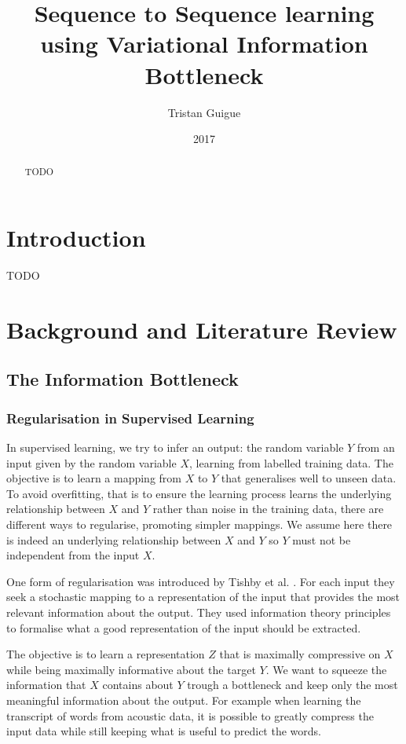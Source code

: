 \documentclass[10pt,oneside,openright]{report}
\title{Sequence to Sequence learning using Variational Information Bottleneck}
\author{Tristan Guigue}
\date{2017}
\begin{document}
\maketitle

\declaration

\begin{abstract}
TODO
\end{abstract}

\tableofcontents

\chapter{Introduction}
TODO
\chapter{Background and Literature Review}

\section{The Information Bottleneck}
\subsection{Regularisation in Supervised Learning}
In supervised learning, we try to infer an output: the random variable $Y$ from an input given by the random variable $X$, learning from labelled training data. The objective is to learn a mapping from $X$ to $Y$ that generalises well to unseen data. To avoid overfitting, that is to ensure the learning process learns the underlying relationship between $X$ and $Y$ rather than noise in the training data, there are different ways to regularise, promoting simpler mappings. We assume here there is indeed an underlying relationship between $X$ and $Y$ so $Y$ must not be independent from the input $X$.

One form of regularisation was introduced by Tishby et al. \cite{tishby}. For each input they seek a stochastic mapping to a representation of the input that provides the most relevant information about the output. They used information theory principles to formalise what a good representation of the input should be extracted. 

The objective is to learn a representation $Z$ that is maximally compressive on $X$ while being maximally informative about the target $Y$. We want to squeeze the information that $X$ contains about $Y$ trough a bottleneck and keep only the most meaningful information about the output. For example when learning the transcript of words from acoustic data, it is possible to greatly compress the input data while still keeping what is useful to predict the words.
\end{document}
